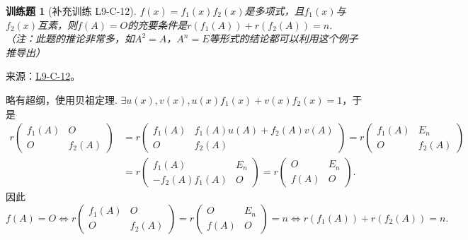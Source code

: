 \documentclass[UTF8,12pt,a4paper,fontset=fandol]{ctexart}
\newtheorem{exercise}{训练题}[section]
\begin{document}
\begin{exercise}[补充训练 L9-C-12]\label{prob:L9-C-12}
$f(x)=f_1(x)f_2(x)$是多项式，且$f_1(x)$与$f_2(x)$互素，则$f(A)=O$的充要条件是$r(f_1(A))+r(f_2(A))=n$. （注：此题的推论非常多，如$A^2=A$，$A^n=E$等形式的结论都可以利用这个例子推导出）
\end{exercise}
\noindent 来源：\href{https://github.com/yhwu-is/Linear-Algebra-Left-Undone/blob/new/%E8%AE%B2%E4%B9%89/%E4%B8%93%E9%A2%98/9%20%E7%9F%A9%E9%98%B5%E8%BF%90%E7%AE%97%E8%BF%9B%E9%98%B6.tex}{L9-C-12}。
\begin{solve}
略有超纲，使用贝祖定理. $\exists u(x),v(x),u(x)f_1(x)+v(x)f_2(x)=1 $，于是
            \begin{align*}
                r\begin{pmatrix}
                    f_1(A) & O      \\
                    O      & f_2(A)
                \end{pmatrix}
                &= r\begin{pmatrix}
                        f_1(A) & f_1(A)u(A)+f_2(A)v(A) \\
                        O      & f_2(A)
                    \end{pmatrix} = r\begin{pmatrix}
                        f_1(A) & E_n    \\
                        O      & f_2(A)
                    \end{pmatrix} \\
                &= r\begin{pmatrix}
                        f_1(A)        & E_n \\
                        -f_2(A)f_1(A) & O
                    \end{pmatrix} = r\begin{pmatrix}
                        O    & E_n \\
                        f(A) & O
                    \end{pmatrix}.
            \end{align*}
            因此
            \[
                f(A) = O \iff
                r\begin{pmatrix}
                    f_1(A) & O      \\
                    O      & f_2(A)
                \end{pmatrix} = r\begin{pmatrix}
                    O    & E_n \\
                    f(A) & O
                \end{pmatrix} = n \iff
                r(f_1(A)) + r(f_2(A)) = n.
            \]
\end{solve}
\end{document}

